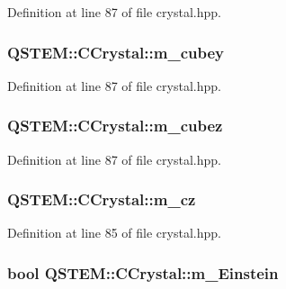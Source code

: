 Definition at line 87 of file crystal.\-hpp.

\hypertarget{class_q_s_t_e_m_1_1_c_crystal_ac81e59aca1acfc7ebe2114d41dc7d75c}{
\subsubsection[{m\-\_\-cubey}]{ Q\-S\-T\-E\-M\-::\-C\-Crystal\-::m\-\_\-cubey\hspace{0.3cm}{\ttfamily [protected]}}}\label{class_q_s_t_e_m_1_1_c_crystal_ac81e59aca1acfc7ebe2114d41dc7d75c}


Definition at line 87 of file crystal.\-hpp.

\hypertarget{class_q_s_t_e_m_1_1_c_crystal_a1da6d74c344ba6a4368f0a02395a486c}{
\subsubsection[{m\-\_\-cubez}]{ Q\-S\-T\-E\-M\-::\-C\-Crystal\-::m\-\_\-cubez\hspace{0.3cm}{\ttfamily [protected]}}}\label{class_q_s_t_e_m_1_1_c_crystal_a1da6d74c344ba6a4368f0a02395a486c}


Definition at line 87 of file crystal.\-hpp.

\hypertarget{class_q_s_t_e_m_1_1_c_crystal_a9d6aacfd521cbe3247f1c40650ed3c36}{
\subsubsection[{m\-\_\-cz}]{ Q\-S\-T\-E\-M\-::\-C\-Crystal\-::m\-\_\-cz\hspace{0.3cm}{\ttfamily [protected]}}}\label{class_q_s_t_e_m_1_1_c_crystal_a9d6aacfd521cbe3247f1c40650ed3c36}


Definition at line 85 of file crystal.\-hpp.

\hypertarget{class_q_s_t_e_m_1_1_c_crystal_a213bfc001b5827a1f6fffcb62c5fcc74}{
\subsubsection[{m\-\_\-\-Einstein}]{\setlength{\rightskip}{0pt plus 5cm}bool Q\-S\-T\-E\-M\-::\-C\-Crystal\-::m\-\_\-\-Einstein\hspace{0.3cm}{\ttfamily [protected]}}}\label{class_q_s_t_e_m_1_1_c_crystal_a213bfc001b5827a1f6fffcb62c5fcc74}


